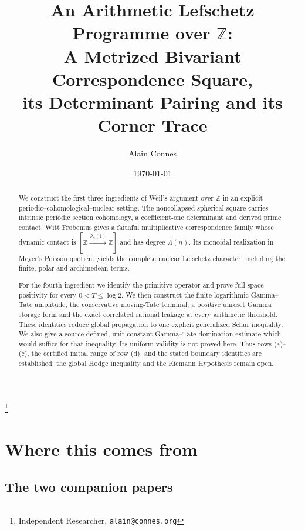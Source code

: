 \documentclass[11pt]{amsart}
\theoremstyle{definition}
\theoremstyle{remark}
\newcommand{\Z}{\mathbb Z}
\begin{document}
\title[An arithmetic Lefschetz programme over $\Z$]
{An Arithmetic Lefschetz Programme over $\Z$:\\
A Metrized Bivariant Correspondence Square,\\
its Determinant Pairing and its Corner Trace}

\author{Alain Connes}
\thanks{Independent Researcher. \texttt{alain@connes.org}}

\date{\today}

\begin{abstract}
We construct the first three ingredients of Weil's argument over $\Z$ in an
explicit periodic--cohomological--nuclear setting.  The noncollapsed
spherical square carries intrinsic periodic section cohomology, a
coefficient-one determinant and derived prime contact.  Witt Frobenius gives
a faithful multiplicative correspondence family whose dynamic contact is
$[\Z\xrightarrow{\Phi_n(1)}\Z]$ and has degree $\Lambda(n)$.  Its monoidal
realization in Meyer's Poisson quotient yields the complete nuclear
Lefschetz character, including the finite, polar and archimedean terms.

For the fourth ingredient we identify the primitive operator and prove
full-space positivity for every $0<T\leq\log2$.  We then construct the
finite logarithmic Gamma--Tate amplitude, the conservative moving-Tate
terminal, a positive unreset Gamma storage form and the exact correlated
rational leakage at every arithmetic threshold.  These identities reduce
global propagation to one explicit generalized Schur inequality.  We also
give a source-defined, unit-constant Gamma--Tate domination estimate which
would suffice for that inequality.  Its uniform validity is not proved here.
Thus rows (a)--(c), the certified initial range of row (d), and the stated
boundary identities are established; the global Hodge inequality and the
Riemann Hypothesis remain open.
\end{abstract}


\maketitle

\section{Where this comes from}

\subsection{The two companion papers}
\end{document}
